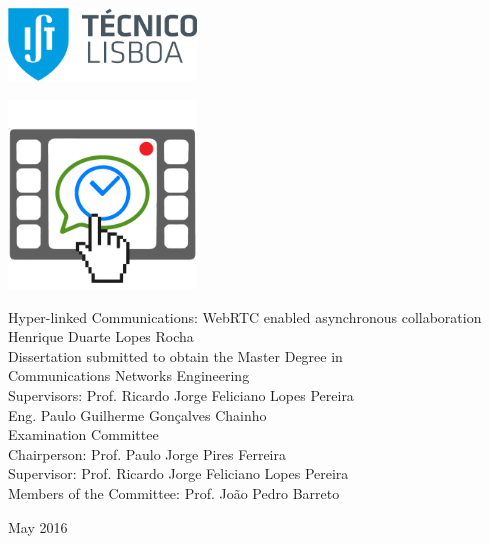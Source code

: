 \thispagestyle{empty}

\includegraphics[width=5.0cm]{Logo.png}

\begin{center}
%
\vspace{0.3cm}
\hspace{-0.5cm}\includegraphics[height=50mm]{Figures/logo.png}

\vspace{0.8cm}
{\FontLb Hyper-linked Communications: WebRTC enabled asynchronous collaboration} \\
\vspace{2.1cm}
{\FontMb Henrique Duarte Lopes Rocha} \\
\vspace{1.4cm}
{\FontLn Dissertation submitted to obtain the Master Degree in} \\
\vspace{0.3cm}
{\FontLb Communications Networks Engineering} \\
\vspace{0.5cm}
{\FontSn %
Supervisors:        Prof. Ricardo Jorge Feliciano Lopes Pereira \\
        Eng.  Paulo Guilherme Gonçalves Chainho \\
}
\vspace{1.9cm}
{\FontMb Examination Committee} \\
\vspace{0.3cm}
{\FontSn %
Chairperson: 	   Prof. Paulo Jorge Pires Ferreira \\
Supervisor:        Prof. Ricardo Jorge Feliciano Lopes Pereira \\
Members of the Committee: Prof. João Pedro Barreto
}
\vspace{1.5cm}

{\FontMb May 2016} \\
%
\end{center}

\cleardoublepage

\restoregeometry
